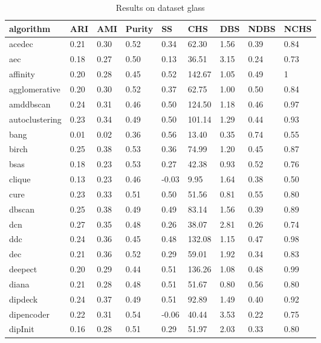 \begin{table}[H]
\centering
\caption{Results on dataset glass}
\label{S63_Table}
\begin{tabular}{|l|l|l|l|l|l|l|l|l|}
\hline
algorithm & ARI & AMI & Purity & SS & CHS & DBS & NDBS & NCHS \\
\hline
acedec & 0.21 & 0.30 & 0.52 & 0.34 & 62.30 & 1.56 & 0.39 & 0.84 \\
\hline
aec & 0.18 & 0.27 & 0.50 & 0.13 & 36.51 & 3.15 & 0.24 & 0.73 \\
\hline
affinity & 0.20 & 0.28 & 0.45 & 0.52 & 142.67 & 1.05 & 0.49 & 1 \\
\hline
agglomerative & 0.20 & 0.30 & 0.52 & 0.37 & 62.75 & 1.00 & 0.50 & 0.84 \\
\hline
amddbscan & 0.24 & 0.31 & 0.46 & 0.50 & 124.50 & 1.18 & 0.46 & 0.97 \\
\hline
autoclustering & 0.23 & 0.34 & 0.49 & 0.50 & 101.14 & 1.29 & 0.44 & 0.93 \\
\hline
bang & 0.01 & 0.02 & 0.36 & 0.56 & 13.40 & 0.35 & 0.74 & 0.55 \\
\hline
birch & 0.25 & 0.38 & 0.53 & 0.36 & 74.99 & 1.20 & 0.45 & 0.87 \\
\hline
bsas & 0.18 & 0.23 & 0.53 & 0.27 & 42.38 & 0.93 & 0.52 & 0.76 \\
\hline
clique & 0.13 & 0.23 & 0.46 & -0.03 & 9.95 & 1.64 & 0.38 & 0.50 \\
\hline
cure & 0.23 & 0.33 & 0.51 & 0.50 & 51.56 & 0.81 & 0.55 & 0.80 \\
\hline
dbscan & 0.25 & 0.38 & 0.49 & 0.49 & 83.14 & 1.56 & 0.39 & 0.89 \\
\hline
dcn & 0.27 & 0.35 & 0.48 & 0.26 & 38.07 & 2.81 & 0.26 & 0.74 \\
\hline
ddc & 0.24 & 0.36 & 0.45 & 0.48 & 132.08 & 1.15 & 0.47 & 0.98 \\
\hline
dec & 0.21 & 0.36 & 0.52 & 0.29 & 59.01 & 1.92 & 0.34 & 0.83 \\
\hline
deepect & 0.20 & 0.29 & 0.44 & 0.51 & 136.26 & 1.08 & 0.48 & 0.99 \\
\hline
diana & 0.21 & 0.28 & 0.48 & 0.51 & 51.67 & 0.80 & 0.56 & 0.80 \\
\hline
dipdeck & 0.24 & 0.37 & 0.49 & 0.51 & 92.89 & 1.49 & 0.40 & 0.92 \\
\hline
dipencoder & 0.22 & 0.31 & 0.54 & -0.06 & 40.44 & 3.53 & 0.22 & 0.75 \\
\hline
dipInit & 0.16 & 0.28 & 0.51 & 0.29 & 51.97 & 2.03 & 0.33 & 0.80 \\

\end{tabular}
\end{table}
